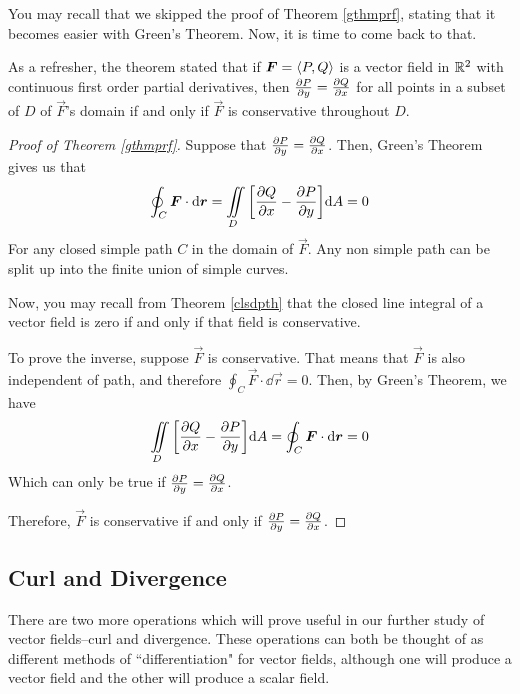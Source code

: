 You may recall that we skipped the proof of Theorem \ref{gthmprf}, stating that it becomes easier with Green's Theorem. Now, it is time to come back to that. \par
As a refresher, the theorem stated that if $\boldsymbol{F} = \left\langle P, Q\right\rangle$ is a vector field in $\mathbb{R}^2$ with continuous first order partial derivatives, then $\pdv{P}{y} = \pdv{Q}{x}$ for all points in a subset of $D$ of $\vec F$'s domain if and only if $\vec F$ is conservative throughout $D$. \par
\begin{proof}[Proof of Theorem \ref{gthmprf}]
Suppose that $\pdv{P}{y} = \pdv{Q}{x}$. Then, Green's Theorem gives us that
\begin{align*}
    \oint_C \vec F \cdot \dd \vec r = \iint\limits_D \bqty{\pdv{Q}{x}-\pdv{P}{y}}\dd A = 0
\end{align*}
For any closed simple path $C$ in the domain of $\vec F$. Any non simple path can be split up into the finite union of simple curves. \par
Now, you may recall from Theorem \ref{clsdpth} that the closed line integral of a vector field is zero if and only if that field is conservative. \par
To prove the inverse, suppose $\vec F$ is conservative. That means that $\vec F$ is also independent of path, and therefore $\oint_C\vec F \cdot \dd \vec r = 0$. Then, by Green's Theorem, we have
\[ \iint\limits_D \bqty{\pdv{Q}{x}-\pdv{P}{y}}\dd A = \oint_C\vec F \cdot \dd \vec r = 0\]
Which can only be true if $\pdv{P}{y} = \pdv{Q}{x}$. \par
 Therefore, $\vec F$ is conservative if and only if $\pdv{P}{y}=\pdv{Q}{x}$.
\end{proof}
\subsection{Curl and Divergence}
There are two more operations which will prove useful in our further study of vector fields--curl and divergence. These operations can both be thought of as different methods of ``differentiation" for vector fields, although one will produce a vector field and the other will produce a scalar field.
